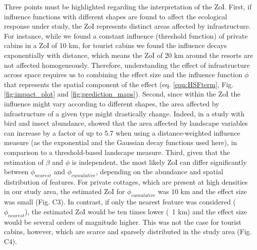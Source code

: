 \documentclass[titlepage]{article}
\begin{document}
{Three points must be highlighted regarding the interpretation of the ZoI.
First, if influence functions with different shapes are found to affect the ecological response under study, the ZoI represents distinct areas affected by infrastructure. For instance, while we found a constant influence (threshold function) of private cabins in a ZoI of 10 km, for tourist cabins we found the influence  decays exponentially with distance, which means the ZoI of 20 km around the resorts are not affected homogeneously. Therefore, understanding the effect of infrastructure across space requires us to combining the effect size and the influence function $\phi$ that represents the spatial component of the effect (eq. \ref{eqn:HSFterm}, Fig. \ref{fig:impact_plot} and \ref{fig:prediction_maps}). Second, since within the ZoI the influence might vary according to different shapes, the area affected by infrastructure of a given type might drastically change. Indeed, in a study with bird and insect abundance, \citet{miguet_how_2017} showed that the area affected by landscape variables can increase by a factor of up to 5.7 when using a distance-weighted influence measure (as the exponential and the Gaussian decay functions used here), in comparison to a threshold-based landscape measure. Third, given that the estimation of $\beta$ and $\phi$ is independent, the most likely ZoI can differ significantly between $\phi_{nearest}$ and $\phi_{cumulative}$, depending on the abundance and spatial distribution of features. For private cottages, which are present at high densities in our study area, the estimated ZoI for $\phi_{cumulative}$ was 10 km and the effect size was small (Fig. C3). In contrast, if only the nearest feature was considered ($\phi_{nearest}$), the estimated ZoI would be ten times lower (~1 km) and the effect size would be several orders of magnitude higher. This was not the case for tourist cabins, however, which are scarce and sparsely distributed in the study area (Fig. C4).


}
\end{document}
